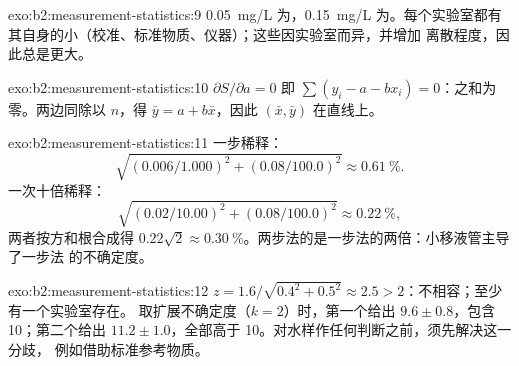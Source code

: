 \begin{solution}{exo:b2:measurement-statistics:9}
\qty{0.05}{mg/L} 为，\qty{0.15}{mg/L} 为。每个实验室都有
其自身的小（校准、标准物质、仪器）；这些因实验室而异，并增加
离散程度，因此总是更大。
\end{solution}

\begin{solution}{exo:b2:measurement-statistics:10}
$\partial S/\partial a = 0$ 即 $\sum(y_i - a - bx_i) = 0$：之和为零。两边同除以
$n$，得 $\bar y = a + b\bar x$，因此 $(\bar x, \bar y)$ 在直线上。
\end{solution}

\begin{solution}{exo:b2:measurement-statistics:11}
一步稀释：
\[\sqrt{(0.006/1.000)^2 + (0.08/100.0)^2} \approx 0.61~\%.\]
一次十倍稀释：
\[\sqrt{(0.02/10.00)^2 + (0.08/100.0)^2} \approx 0.22~\%,\]
两者按方和根合成得 $0.22\sqrt2 \approx 0.30~\%$。两步法的是一步法的两倍：小移液管主导了一步法
的不确定度。
\end{solution}

\begin{solution}{exo:b2:measurement-statistics:12}
$z = 1.6/\sqrt{0.4^2 + 0.5^2} \approx 2.5 > 2$：不相容；至少有一个实验室存在。
取扩展不确定度（$k = 2$）时，第一个给出 $9.6 \pm 0.8$，包含 10；第二个给出
$11.2 \pm 1.0$，全部高于 10。对水样作任何判断之前，须先解决这一分歧，
例如借助标准参考物质。
\end{solution}

